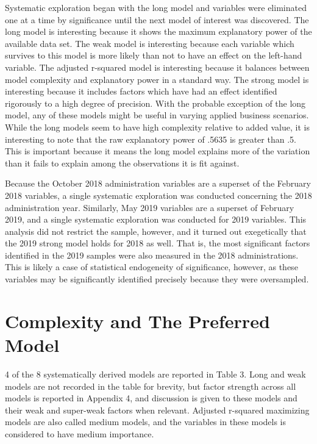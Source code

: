 \documentclass[AER]{/Users/zyl357/Documents/GitHub/research-dissertation-case-for-alt-ed/papers/alt-ed-survey/aea-latex-templates/AEA}
\begin{document}
Systematic exploration began with the long model and variables were
eliminated one at a time by significance until the next model of interest
was discovered. The long model is interesting because it shows the maximum
explanatory power of the available data set. The weak model is interesting
because each variable which survives to this model is more likely than not
to have an effect on the left-hand variable. The adjusted r-squared model
is interesting because it balances between model complexity and
explanatory power in a standard way. The strong model is interesting
because it includes factors which have had an effect identified rigorously
to a high degree of precision. With the probable exception of the long
model, any of these models might be useful in varying applied business
scenarios. While the long models seem to have high complexity relative to
added value, it is interesting to note that the raw explanatory power of
.5635 is greater than .5. This is important because it means the long
model explains more of the variation than it fails to explain among the
observations it is fit against.

Because the October 2018 administration variables are a superset of the
February 2018 variables, a single systematic exploration was conducted
concerning the 2018 administration year. Similarly, May 2019 variables are
a superset of February 2019, and a single systematic exploration was
conducted for 2019 variables. This analysis did not restrict the sample,
however, and it turned out exegetically that the 2019 strong model holds
for 2018 as well. That is, the most significant factors identified in the
2019 samples were also measured in the 2018 administrations. This is
likely a case of statistical endogeneity of significance, however, as
these variables may be significantly identified precisely because they
were oversampled.

\section{Complexity and The Preferred Model}

4 of the 8 systematically derived models are reported in Table 3. Long and
weak models are not recorded in the table for brevity, but factor strength
across all models is reported in Appendix 4, and discussion is given to
these models and their weak and super-weak factors when relevant. Adjusted
r-squared maximizing models are also called medium models, and the
variables in these models is considered to have medium importance.
\end{document}
